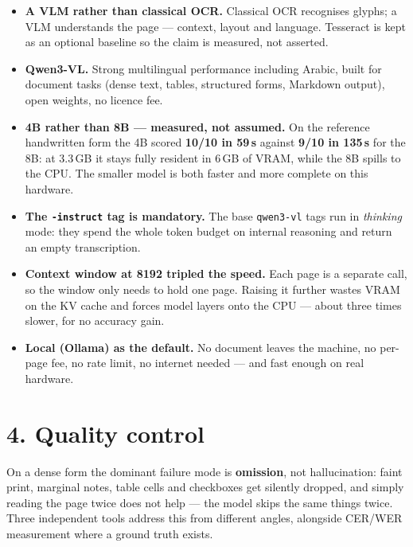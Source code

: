 \documentclass[10pt,a4paper]{article}
\begin{document}
\begin{itemize}
  \item \textbf{A VLM rather than classical OCR.} Classical OCR recognises
        glyphs; a VLM understands the page --- context, layout and language.
        Tesseract is kept as an optional baseline so the claim is measured, not
        asserted.
  \item \textbf{Qwen3-VL.} Strong multilingual performance including Arabic,
        built for document tasks (dense text, tables, structured forms,
        Markdown output), open weights, no licence fee.
  \item \textbf{4B rather than 8B --- measured, not assumed.} On the reference
        handwritten form the 4B scored \textbf{10/10 in 59\,s} against
        \textbf{9/10 in 135\,s} for the 8B: at 3.3\,GB it stays fully resident
        in 6\,GB of VRAM, while the 8B spills to the CPU. The smaller model is
        both faster and more complete on this hardware.
  \item \textbf{The \texttt{-instruct} tag is mandatory.} The base
        \texttt{qwen3-vl} tags run in \emph{thinking} mode: they spend the whole
        token budget on internal reasoning and return an empty transcription.
  \item \textbf{Context window at 8192 tripled the speed.} Each page is a
        separate call, so the window only needs to hold one page. Raising it
        further wastes VRAM on the KV cache and forces model layers onto the
        CPU --- about three times slower, for no accuracy gain.
  \item \textbf{Local (Ollama) as the default.} No document leaves the machine,
        no per-page fee, no rate limit, no internet needed --- and fast enough
        on real hardware.
\end{itemize}

\section*{4. Quality control}

On a dense form the dominant failure mode is \textbf{omission}, not
hallucination: faint print, marginal notes, table cells and checkboxes get
silently dropped, and simply reading the page twice does not help --- the model
skips the same things twice. Three independent tools address this from
different angles, alongside CER/WER measurement where a ground truth exists.
\end{document}
